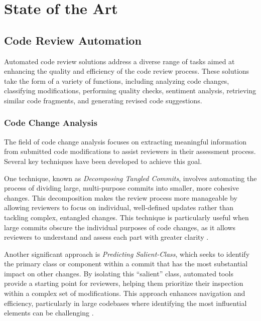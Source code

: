 \section{State of the Art}

\subsection{Code Review Automation}

Automated code review solutions address a diverse range of tasks aimed at
enhancing the quality and efficiency of the code review process. These
solutions take the form of a variety of functions, including analyzing code
changes, classifying modifications, performing quality checks, sentiment
analysis, retrieving similar code fragments, and generating revised code
suggestions.

\subsubsection{Code Change Analysis}

The field of code change analysis focuses on extracting meaningful information
from submitted code modifications to assist reviewers in their assessment
process. Several key techniques have been developed to achieve this goal.

One technique, known as \textit{Decomposing Tangled Commits}, involves
automating the process of dividing large, multi-purpose commits into smaller,
more cohesive changes. This decomposition makes the review process more
manageable by allowing reviewers to focus on individual, well-defined updates
rather than tackling complex, entangled changes. This technique is particularly
useful when large commits obscure the individual purposes of code changes, as
it allows reviewers to understand and assess each part with greater clarity
\cite{barnett:icse2015,tao:msr2015,wang:ase2019}.

Another significant approach is \textit{Predicting Salient-Class}, which seeks
to identify the primary class or component within a commit that has the most
substantial impact on other changes. By isolating this ``salient'' class,
automated tools provide a starting point for reviewers, helping them prioritize
their inspection within a complex set of modifications. This approach enhances
navigation and efficiency, particularly in large codebases where identifying
the most influential elements can be challenging \cite{huang:tse2020}.

